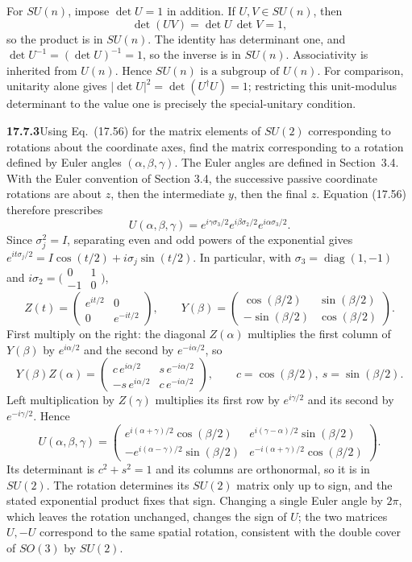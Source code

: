 For $SU(n)$, impose $\det U=1$ in addition.
If $U,V\in SU(n)$, then
\[
\det(UV)=\det U\,\det V=1,
\]
so the product is in $SU(n)$. The identity has determinant one,
and $\det U^{-1}=(\det U)^{-1}=1$, so the inverse is in $SU(n)$.
Associativity is inherited from $U(n)$.
Hence \(\boxed{SU(n)\text{ is a subgroup of }U(n)}\).
For comparison, unitarity alone gives
$|\det U|^2=\det(U^\dagger U)=1$; restricting this unit-modulus
determinant to the value one is precisely the special-unitary condition.

\par\bigskip
\noindent\textbf{17.7.3}\quad Using Eq.~(17.56) for the matrix
elements of $SU(2)$ corresponding to rotations about the coordinate
axes, find the matrix corresponding to a rotation defined by Euler
angles $(\alpha,\beta,\gamma)$. The Euler angles are defined in
Section~3.4.
\solution
With the Euler convention of Section 3.4, the successive passive
coordinate rotations are about $z$, then the intermediate $y$,
then the final $z$. Equation (17.56) therefore prescribes
\[
U(\alpha,\beta,\gamma)
=e^{i\gamma\sigma_3/2}e^{i\beta\sigma_2/2}e^{i\alpha\sigma_3/2}.
\]
Since $\sigma_j^2=I$, separating even and odd powers of the
exponential gives
$e^{it\sigma_j/2}=I\cos(t/2)+i\sigma_j\sin(t/2)$.
In particular, with $\sigma_3=\operatorname{diag}(1,-1)$ and
$i\sigma_2=\bigl(\begin{smallmatrix}0&1\\-1&0\end{smallmatrix}\bigr)$,
\[
Z(t)=\begin{pmatrix}e^{it/2}&0\\0&e^{-it/2}\end{pmatrix},
\qquad
Y(\beta)=\begin{pmatrix}\cos(\beta/2)&\sin(\beta/2)\\
-\sin(\beta/2)&\cos(\beta/2)\end{pmatrix}.
\]
First multiply on the right: the diagonal $Z(\alpha)$ multiplies the
first column of $Y(\beta)$ by $e^{i\alpha/2}$ and the second by
$e^{-i\alpha/2}$, so
\[
Y(\beta)Z(\alpha)=
\begin{pmatrix}
c\,e^{i\alpha/2}&s\,e^{-i\alpha/2}\\
-s\,e^{i\alpha/2}&c\,e^{-i\alpha/2}
\end{pmatrix},
\qquad c=\cos(\beta/2),\ s=\sin(\beta/2).
\]
Left multiplication by $Z(\gamma)$ multiplies its first row by
$e^{i\gamma/2}$ and its second by $e^{-i\gamma/2}$. Hence
\[
\boxed{U(\alpha,\beta,\gamma)=
\begin{pmatrix}
e^{i(\alpha+\gamma)/2}\cos(\beta/2)&
e^{i(\gamma-\alpha)/2}\sin(\beta/2)\\
-e^{i(\alpha-\gamma)/2}\sin(\beta/2)&
e^{-i(\alpha+\gamma)/2}\cos(\beta/2)
\end{pmatrix}}.
\]
Its determinant is $c^2+s^2=1$ and its columns are orthonormal,
so it is in $SU(2)$. The rotation determines its $SU(2)$ matrix
only up to sign, and the stated exponential product fixes that sign.
Changing a single Euler angle by $2\pi$, which leaves the rotation
unchanged, changes the sign of $U$; the two matrices $U,-U$
correspond to the same spatial rotation, consistent with the double
cover of $SO(3)$ by $SU(2)$.

